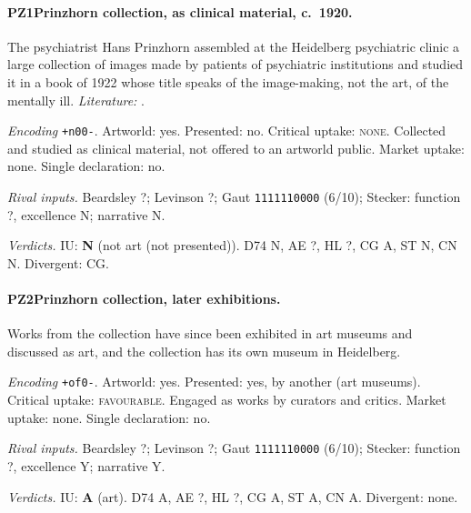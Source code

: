 \paragraph{PZ1\enspace Prinzhorn collection, as clinical material, c.~1920.}
The psychiatrist Hans Prinzhorn assembled at the Heidelberg psychiatric clinic a large collection of images made by patients of psychiatric institutions and studied it in a book of 1922 whose title speaks of the image-making, not the art, of the mentally ill. \textit{Literature:} \citet{Prinzhorn1922}.\par
\noindent\textit{Encoding} \texttt{+n00-}. Artworld: yes. Presented: no. Critical uptake: \textsc{none}. Collected and studied as clinical material, not offered to an artworld public. Market uptake: none. Single declaration: no.\par
\noindent\textit{Rival inputs.} Beardsley ?; Levinson ?; Gaut \texttt{1111110000} (6/10); Stecker: function ?, excellence N; narrative N.\par
\noindent\textit{Verdicts.} IU: \textbf{N} (not art (not presented)). D74 N, AE ?, HL ?, CG A, ST N, CN N. Divergent: CG.\par

\paragraph{PZ2\enspace Prinzhorn collection, later exhibitions.}
Works from the collection have since been exhibited in art museums and discussed as art, and the collection has its own museum in Heidelberg.\par
\noindent\textit{Encoding} \texttt{+of0-}. Artworld: yes. Presented: yes, by another (art museums). Critical uptake: \textsc{favourable}. Engaged as works by curators and critics. Market uptake: none. Single declaration: no.\par
\noindent\textit{Rival inputs.} Beardsley ?; Levinson ?; Gaut \texttt{1111110000} (6/10); Stecker: function ?, excellence Y; narrative Y.\par
\noindent\textit{Verdicts.} IU: \textbf{A} (art). D74 A, AE ?, HL ?, CG A, ST A, CN A. Divergent: none.\par

